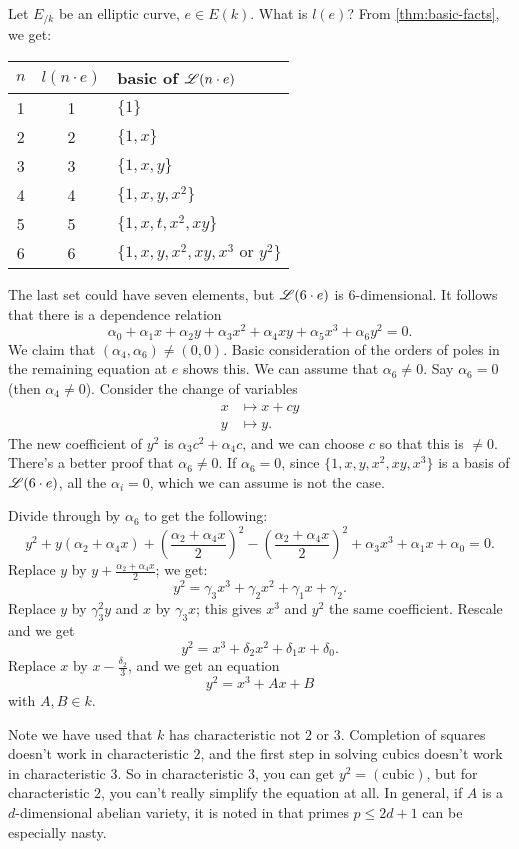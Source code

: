 Let $E_{/k}$ be an elliptic curve, $e\in E(k)$. What is $l(e)$? From 
\autoref{thm:basic-facts}, we get: 
\begin{center}
\begin{tabular}{c|cl}
$n$ & $l(n\cdot e)$ & basic of $\mathscr{L}(n\cdot e)$ \\ \hline
1 & 1 & $\{1\}$ \\
2 & 2 & $\{1,x\}$ \\
3 & 3 & $\{1,x,y\}$ \\
4 & 4 & $\{1,x,y,x^2\}$ \\
5 & 5 & $\{1,x,t,x^2,x y\}$ \\
6 & 6 & $\{1,x,y,x^2,x y, x^3\text{ or } y^2\}$ 
\end{tabular}
\end{center}
The last set could have seven elements, but $\mathscr{L}(6\cdot e)$ is 
$6$-dimensional. It follows that there is a dependence relation 
\[
  \alpha_0 + \alpha_1 x + \alpha_2 y+ \alpha_3 x^2 + \alpha_4 x y+\alpha_5 x^3 + \alpha_6 y^2 = 0 .
\]
We claim that $(\alpha_4,\alpha_6)\ne (0,0)$. Basic consideration of the 
orders of poles in the remaining equation at $e$ shows this. We can assume that 
$\alpha_6\ne 0$. Say $\alpha_6=0$ (then $\alpha_4\ne 0$). Consider the change 
of variables 
\begin{align*}
  x &\mapsto x + cy \\
  y &\mapsto y. 
\end{align*}
The new coefficient of $y^2$ is $\alpha_3 c^2 + \alpha_4 c$, and we can choose 
$c$ so that this is $\ne 0$. There's a better proof that $\alpha_6\ne 0$. If 
$\alpha_6=0$, since $\{1,x,y,x^2,x y,x^3\}$ is a basis of $\mathscr{L}(6\cdot e)$, all 
the $\alpha_i=0$, which we can assume is not the case. 

Divide through by $\alpha_6$ to get the following:
\[
  y^2 + y (\alpha_2+\alpha_4 x) + \left(\frac{\alpha_2+\alpha_4 x}{2}\right)^2 - \left(\frac{\alpha_2+\alpha_4 x}{2}\right)^2 + \alpha_3 x^3 + \alpha_1 x + \alpha_0 = 0 .
\]
Replace $y$ by $y+\frac{\alpha_2+\alpha_4 x}{2}$; we get: 
\[
  y^2 = \gamma_3 x^3 + \gamma_2 x^2 + \gamma_1 x + \gamma_2 .
\]
Replace $y$ by $\gamma_3^2 y$ and $x$ by $\gamma_3 x$; this gives 
$x^3$ and $y^2$ the same coefficient. Rescale and we get 
\[
  y^2 = x^3 + \delta_2 x^2 + \delta_1 x + \delta_0 .
\]
Replace $x$ by $x-\frac{\delta_2}{3}$, and we get an equation 
\[
  y^2 = x^3 + A x+B 
\]
with $A,B\in k$. 

Note we have used that $k$ has characteristic not $2$ or 
$3$. Completion of squares doesn't work in characteristic $2$, and the 
first step in solving cubics doesn't work in characteristic $3$. So in 
characteristic $3$, you can get $y^2=(\text{cubic})$, but for characteristic 
$2$, you can't really simplify the equation at all. In general, if $A$ is a 
$d$-dimensional abelian variety, it is noted in \cite{serre-tate-1968} that 
primes $p\leqslant 2 d+1$ can be especially nasty. 

